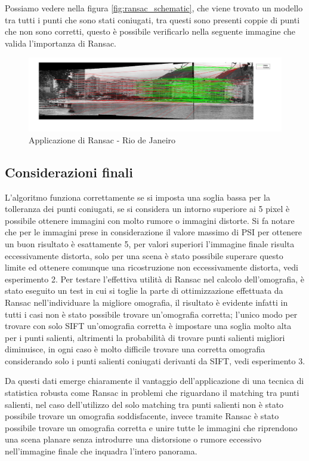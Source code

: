 \documentclass[11pt, oneside]{article}   	%
\begin{document}
Possiamo vedere nella figura \ref{fig:ransac_schematic}, che viene trovato un modello tra tutti i punti che sono stati coniugati, tra questi sono presenti coppie di punti che non sono corretti, questo è possibile verificarlo nella seguente immagine che valida l'importanza di Ransac.


\begin{figure}[H]
\includegraphics[width=\textwidth]{rio_check_ransac_immagine_ultima_iterazione.jpg}
\caption{Applicazione di Ransac - Rio de Janeiro}
\label{fig:ransac}
\end{figure}

\subsection{Considerazioni finali}

L'algoritmo funziona correttamente se si imposta una soglia bassa per la tolleranza dei punti coniugati, se si considera un intorno superiore ai 5 pixel è possibile ottenere immagini con molto rumore o immagini distorte.
Si fa notare che per le immagini prese in considerazione il valore massimo di PSI per ottenere un buon risultato è esattamente 
5, per valori superiori l'immagine finale risulta eccessivamente distorta, solo per una scena è stato possibile superare questo limite ed ottenere comunque una ricostruzione non eccessivamente distorta, vedi esperimento 2.
Per testare l'effettiva utilità di Ransac nel calcolo dell'omografia, è stato eseguito un test in cui si toglie la parte di ottimizzazione effettuata da Ransac nell'individuare la migliore omografia, il risultato è evidente infatti in tutti i casi non è stato possibile trovare un'omografia corretta; l'unico modo per trovare con solo SIFT un'omografia corretta è impostare una soglia molto alta per i punti salienti, altrimenti la probabilità di trovare punti salienti migliori diminuisce, in ogni caso è molto difficile trovare una corretta omografia considerando solo i punti salienti coniugati derivanti da SIFT, vedi esperimento 3.



Da questi dati emerge chiaramente il vantaggio dell'applicazione di una tecnica di statistica robusta come Ransac in problemi che riguardano il matching tra punti salienti, nel caso dell'utilizzo del solo matching tra punti salienti non è stato possibile trovare un omografia soddisfacente, invece tramite Ransac è stato possibile trovare un omografia corretta e unire tutte le immagini che riprendono una scena planare senza introdurre una distorsione o rumore eccessivo nell'immagine finale che inquadra l'intero panorama. 
\end{document}
